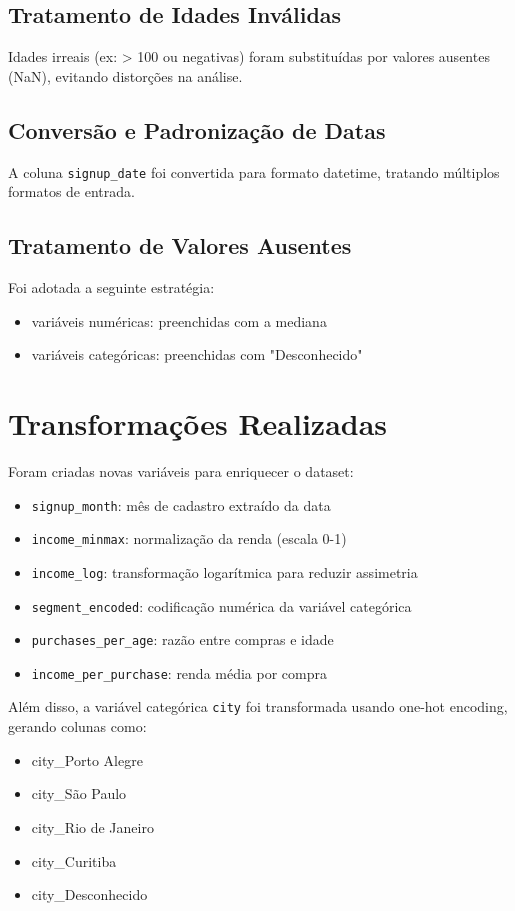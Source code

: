 \documentclass[11pt]{article}
\begin{document}
\subsection{Tratamento de Idades Inválidas}
\label{sec:org58a527d}
Idades irreais (ex: > 100 ou negativas) foram substituídas por valores ausentes (NaN), evitando distorções na análise.
\subsection{Conversão e Padronização de Datas}
\label{sec:org24658e5}
A coluna \texttt{signup\_date} foi convertida para formato datetime, tratando múltiplos formatos de entrada.
\subsection{Tratamento de Valores Ausentes}
\label{sec:orgd3fdc56}
Foi adotada a seguinte estratégia:
\begin{itemize}
\item variáveis numéricas: preenchidas com a mediana
\item variáveis categóricas: preenchidas com "Desconhecido"
\end{itemize}
\section{Transformações Realizadas}
\label{sec:org6e8c689}

Foram criadas novas variáveis para enriquecer o dataset:

\begin{itemize}
\item \texttt{signup\_month}: mês de cadastro extraído da data
\item \texttt{income\_minmax}: normalização da renda (escala 0-1)
\item \texttt{income\_log}: transformação logarítmica para reduzir assimetria
\item \texttt{segment\_encoded}: codificação numérica da variável categórica
\item \texttt{purchases\_per\_age}: razão entre compras e idade
\item \texttt{income\_per\_purchase}: renda média por compra
\end{itemize}

Além disso, a variável categórica \texttt{city} foi transformada usando one-hot encoding, gerando colunas como:
\begin{itemize}
\item city\_Porto Alegre
\item city\_São Paulo
\item city\_Rio de Janeiro
\item city\_Curitiba
\item city\_Desconhecido
\end{itemize}
\end{document}
